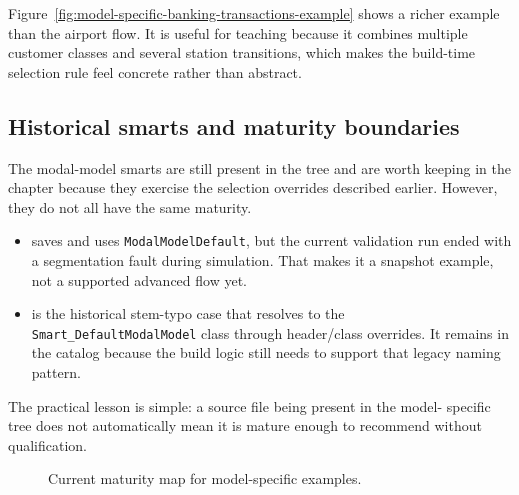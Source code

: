 Figure~\ref{fig:model-specific-banking-transactions-example} shows a richer
example than the airport flow. It is useful for teaching because it combines
multiple customer classes and several station transitions, which makes the
build-time selection rule feel concrete rather than abstract.

\subsection{Historical smarts and maturity boundaries}
\label{subsec:model-specific-maturity}

The modal-model smarts are still present in the tree and are worth keeping in
the chapter because they exercise the selection overrides described earlier.
However, they do not all have the same maturity.

\begin{itemize}
\item {} saves
 and uses \texttt{ModalModelDefault}, but
the current validation run ended with a segmentation fault during simulation.
That makes it a snapshot example, not a supported advanced flow yet.
\item {} is the historical
stem-typo case that resolves to the \texttt{Smart\_DefaultModalModel} class
through header/class overrides. It remains in the catalog because the build
logic still needs to support that legacy naming pattern.
\end{itemize}

The practical lesson is simple: a source file being present in the model-
specific tree does not automatically mean it is mature enough to recommend
without qualification.

\begin{figure}[htbp]
\centering
\caption{Current maturity map for model-specific examples.}
\label{fig:model-specific-maturity-map}
\end{figure}

